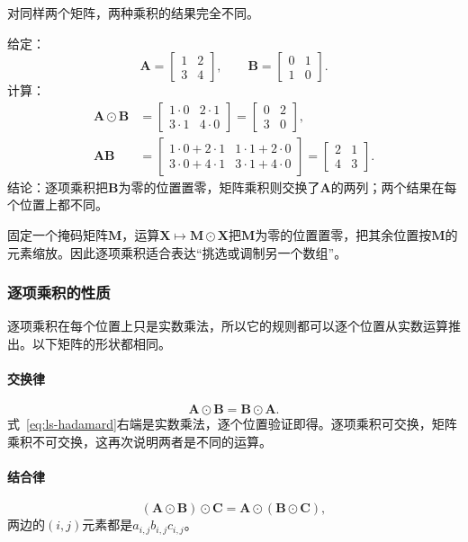 对同样两个矩阵，两种乘积的结果完全不同。
\begin{example}[逐项乘积与矩阵乘积的对比]
\label{ex:ls-hadamard-vs-matrix-product}
给定：
\[
\bm A=\begin{bmatrix}1&2\\3&4\end{bmatrix},\qquad
\bm B=\begin{bmatrix}0&1\\1&0\end{bmatrix}.
\]
计算：
\[
 \begin{aligned}
 \bm A\odot\bm B&=\begin{bmatrix}1\cdot0&2\cdot1\\3\cdot1&4\cdot0\end{bmatrix}=\begin{bmatrix}0&2\\3&0\end{bmatrix},\\
 \bm A\bm B&=\begin{bmatrix}1\cdot0+2\cdot1&1\cdot1+2\cdot0\\3\cdot0+4\cdot1&3\cdot1+4\cdot0\end{bmatrix}=\begin{bmatrix}2&1\\4&3\end{bmatrix}.
 \end{aligned}
\]
结论：逐项乘积把$\bm B$为零的位置置零，矩阵乘积则交换了$\bm A$的两列；两个结果在每个位置上都不同。
\end{example}
固定一个掩码矩阵$\bm M$，运算$\bm X\mapsto\bm M\odot\bm X$把$\bm M$为零的位置置零，把其余位置按$\bm M$的元素缩放。因此逐项乘积适合表达“挑选或调制另一个数组”。

\subsubsection{逐项乘积的性质}

逐项乘积在每个位置上只是实数乘法，所以它的规则都可以逐个位置从实数运算推出。以下矩阵的形状都相同。

\paragraph{交换律}
\[
 \bm A\odot\bm B=\bm B\odot\bm A.
\]
式~\eqref{eq:ls-hadamard}右端是实数乘法，逐个位置验证即得。逐项乘积可交换，矩阵乘积不可交换，这再次说明两者是不同的运算。

\paragraph{结合律}
\[
 (\bm A\odot\bm B)\odot\bm C=\bm A\odot(\bm B\odot\bm C),
\]
两边的$(i,j)$元素都是$a_{i,j}b_{i,j}c_{i,j}$。

